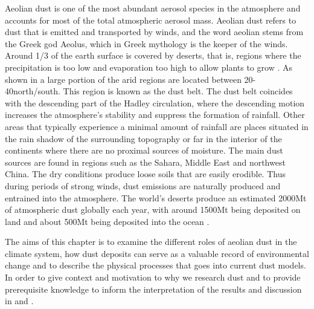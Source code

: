 
Aeolian dust is one of the most abundant aerosol species in the atmosphere and accounts for most of the total atmospheric aerosol mass.
Aeolian dust refers to dust that is emitted and transported by winds, and the word aeolian stems from the Greek god Aeolus, which in Greek mythology is the keeper of the winds. 
Around 1/3 of the earth surface is covered by deserts, that is, regions where the precipitation is too low and evaporation too high to allow plants to grow \parencite{williams_climate_2014}.
As shown in  a large portion of the arid regions are located between 20\degree - 40\degree north/south. 
This region is known as the dust belt. 
The dust belt coincides with the descending part of the Hadley circulation, where the descending motion increases the atmosphere's stability and suppress the formation of rainfall. 
Other areas that typically experience a minimal amount of rainfall are places situated in the rain shadow of the surrounding topography or far in the interior of the continents where there are no proximal sources of moisture.  
The main dust sources are found in regions such as the Sahara, Middle East and northwest China.
The dry conditions produce loose soils that are easily erodible. 
Thus during periods of strong winds, dust emissions are naturally produced and entrained into the atmosphere. 
The world's deserts produce an estimated 2000Mt of atmospheric dust globally each year, with around 1500Mt being deposited on land and about 500Mt being deposited into the ocean \parencite{shao2011dust}. 

The aims of this chapter is to examine the different roles of aeolian dust in the climate system, how dust deposits can serve as a valuable record of environmental change and to describe the physical processes that goes into current dust models. In order to give context and motivation to why we research dust and to provide prerequisite knowledge to inform the interpretation of the results and discussion in  and .  

